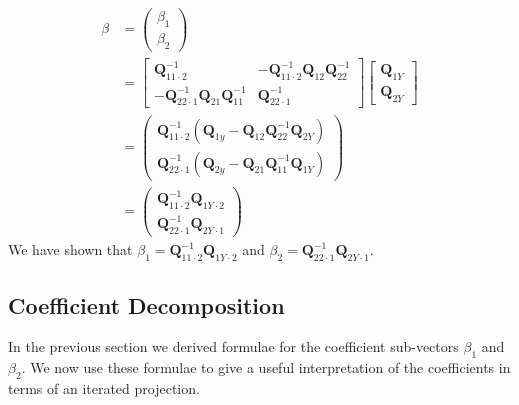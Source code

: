 \documentclass[10pt]{article}
\begin{document}
$$
\begin{aligned}
\beta &=\left(\begin{array}{l}
\beta_{1} \\
\beta_{2}
\end{array}\right) \\
&=\left[\begin{array}{cc}
\boldsymbol{Q}_{11 \cdot 2}^{-1} & -\boldsymbol{Q}_{11 \cdot 2}^{-1} \boldsymbol{Q}_{12} \boldsymbol{Q}_{22}^{-1} \\
-\boldsymbol{Q}_{22 \cdot 1}^{-1} \boldsymbol{Q}_{21} \boldsymbol{Q}_{11}^{-1} & \boldsymbol{Q}_{22 \cdot 1}^{-1}
\end{array}\right]\left[\begin{array}{l}
\boldsymbol{Q}_{1 Y} \\
\boldsymbol{Q}_{2 Y}
\end{array}\right] \\
&=\left(\begin{array}{c}
\boldsymbol{Q}_{11 \cdot 2}^{-1}\left(\boldsymbol{Q}_{1 y}-\boldsymbol{Q}_{12} \boldsymbol{Q}_{22}^{-1} \boldsymbol{Q}_{2 Y}\right) \\
\boldsymbol{Q}_{22 \cdot 1}^{-1}\left(\boldsymbol{Q}_{2 y}-\boldsymbol{Q}_{21} \boldsymbol{Q}_{11}^{-1} \boldsymbol{Q}_{1 Y}\right)
\end{array}\right) \\
&=\left(\begin{array}{c}
\boldsymbol{Q}_{11 \cdot 2}^{-1} \boldsymbol{Q}_{1 Y \cdot 2} \\
\boldsymbol{Q}_{22 \cdot 1}^{-1} \boldsymbol{Q}_{2 Y \cdot 1}
\end{array}\right)
\end{aligned}
$$
We have shown that $\beta_{1}=\boldsymbol{Q}_{11 \cdot 2}^{-1} \boldsymbol{Q}_{1 Y \cdot 2}$ and $\beta_{2}=\boldsymbol{Q}_{22 \cdot 1}^{-1} \boldsymbol{Q}_{2 Y \cdot 1}$.

\subsection{Coefficient Decomposition}
In the previous section we derived formulae for the coefficient sub-vectors $\beta_{1}$ and $\beta_{2}$. We now use these formulae to give a useful interpretation of the coefficients in terms of an iterated projection.
\end{document}
